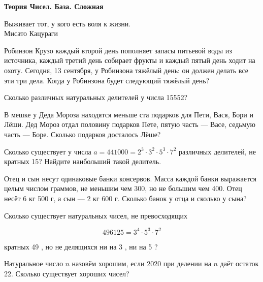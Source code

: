 \centerline{\bf \Huge Теория Чисел. База. Сложная}

\begin{flushright}
        \scriptsize{Выживает тот, у кого есть воля к жизни.\\ Мисато Кацураги}
\end{flushright}


 Робинзон Крузо каждый второй день пополняет запасы питьевой
воды из источника, каждый третий день собирает фрукты и каждый пятый день ходит на охоту.
Сегодня, 13 сентября, у Робинзона тяжёлый день: он должен делать все эти три дела. Когда
у Робинзона будет следующий тяжёлый день?

 Сколько различных натуральных делителей у числа 15552?

 В мешке у Деда Мороза находятся меньше ста подарков для
Пети, Вася, Бори и Лёши. Дед Мороз отдал половину подарков Пете, пятую часть — Васе,
седьмую часть — Боре. Сколько подарков досталось Лёше?


 Сколько существует у числа $a=441000=2^3 \cdot 3^2 \cdot 5^3 \cdot 7^2$ различных делителей, не кратных 15? Найдите наибольший такой делитель.

 Отец и сын несут одинаковые банки консервов. Масса каждой
банки выражается целым числом граммов, не меньшим чем 300, но не большим чем 400. Отец
несёт 6 кг 500 г, а сын — 2 кг 600 г. Сколько банок у отца и сколько у сына?

 Сколько существует натуральных чисел, не превосходящих

$$
496125=3^4 \cdot 5^3 \cdot 7^2
$$


кратных 49 , но не делящихся ни на 3 , ни на 5 ?

 Натуральное число $n$ назовём хорошим, если 2020 при делении на $n$ даёт остаток 22. Сколько существует хороших чисел?